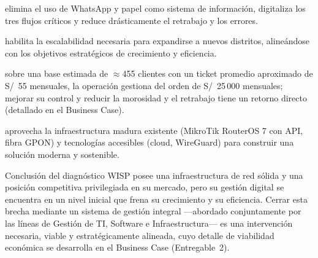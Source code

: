 \begin{description}[leftmargin=0pt, style=nextline]
  \item[Justificación operativa:] elimina el uso de WhatsApp y papel como sistema de
  información, digitaliza los tres flujos críticos y reduce drásticamente el retrabajo
  y los errores.
  \item[Justificación estratégica:] habilita la escalabilidad necesaria para expandirse
  a nuevos distritos, alineándose con los objetivos estratégicos de crecimiento y
  eficiencia.
  \item[Justificación económica:] sobre una base estimada de $\approx$455 clientes con
  un ticket promedio aproximado de S/~55 mensuales, la operación gestiona del orden de
  S/~25\,000 mensuales; mejorar su control y reducir la morosidad y el retrabajo tiene un
  retorno directo (detallado en el Business Case).
  \item[Justificación tecnológica:] aprovecha la infraestructura madura existente
  (MikroTik RouterOS 7 con API, fibra GPON) y tecnologías accesibles (cloud, WireGuard)
  para construir una solución moderna y sostenible.
\end{description}

\begin{upeubox}{Conclusión del diagnóstico}
WISP posee una infraestructura de red sólida y una posición competitiva privilegiada
en su mercado, pero su gestión digital se encuentra en un nivel inicial que frena su
crecimiento y su eficiencia. Cerrar esta brecha mediante un sistema de gestión integral
---abordado conjuntamente por las líneas de Gestión de TI, Software e Infraestructura---
es una intervención necesaria, viable y estratégicamente alineada, cuyo detalle de
viabilidad económica se desarrolla en el Business Case (Entregable~2).
\end{upeubox}
